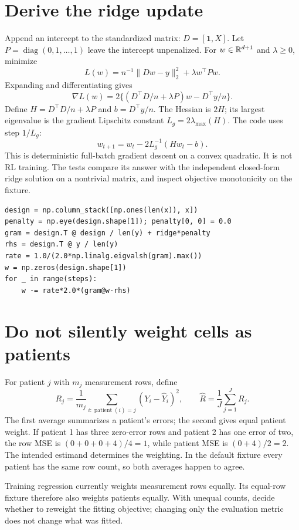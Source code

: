 \documentclass[11pt,oneside]{scrbook}
\begin{document}
\section{Derive the ridge update}
Append an intercept to the standardized matrix: $D=[\mathbf1,X]$.
Let $P=\operatorname{diag}(0,1,\ldots,1)$ leave the intercept unpenalized. For
$w\in\mathbb{R}^{d+1}$ and $\lambda\ge0$, minimize
\[
L(w)=n^{-1}\|Dw-y\|_2^2+\lambda w^\top Pw.
\]
Expanding and differentiating gives
\[
\nabla L(w)=2\{(D^\top D/n+\lambda P)w-D^\top y/n\}.
\]
Define $H=D^\top D/n+\lambda P$ and $b=D^\top y/n$. The Hessian is $2H$;
its largest eigenvalue is the gradient Lipschitz constant $L_g=2\lambda_{\max}(H)$.
The code uses step $1/L_g$:
\[
w_{t+1}=w_t-2L_g^{-1}(Hw_t-b).
\]
This is deterministic full-batch gradient descent on a convex quadratic. It is not
RL training. The tests compare its answer with the independent closed-form ridge
solution on a nontrivial matrix, and inspect objective monotonicity on the fixture.

\begin{verbatim}
design = np.column_stack([np.ones(len(x)), x])
penalty = np.eye(design.shape[1]); penalty[0, 0] = 0.0
gram = design.T @ design / len(y) + ridge*penalty
rhs = design.T @ y / len(y)
rate = 1.0/(2.0*np.linalg.eigvalsh(gram).max())
w = np.zeros(design.shape[1])
for _ in range(steps):
    w -= rate*2.0*(gram@w-rhs)
\end{verbatim}

\section{Do not silently weight cells as patients}
For patient $j$ with $m_j$ measurement rows, define
\[
R_j=\frac1{m_j}\sum_{i:\operatorname{patient}(i)=j}(Y_i-\widehat Y_i)^2,
\qquad \widehat R=\frac1J\sum_{j=1}^J R_j.
\]
The first average summarizes a patient's errors; the second gives equal patient
weight. If patient 1 has three zero-error rows and patient 2 has one error of two,
the row MSE is $(0+0+0+4)/4=1$, while patient MSE is $(0+4)/2=2$.
The intended estimand determines the weighting. In the default fixture every patient
has the same row count, so both averages happen to agree.

Training regression currently weights measurement rows equally. Its equal-row fixture
therefore also weights patients equally. With unequal counts, decide whether to reweight
the fitting objective; changing only the evaluation metric does not change what was fitted.
\end{document}
